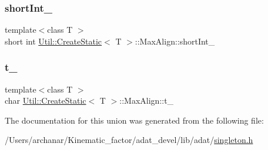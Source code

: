 \mbox{\label{unionUtil_1_1CreateStatic_1_1MaxAlign_a334412ad4ce26924cece7d29af8e8631}} 
\subsubsection{\texorpdfstring{shortInt\_}{shortInt\_}}
{\footnotesize\ttfamily template$<$class T $>$ \\
short int \mbox{\hyperlink{structUtil_1_1CreateStatic}{Util\+::\+Create\+Static}}$<$ T $>$\+::Max\+Align\+::short\+Int\+\_\+}

\mbox{\label{unionUtil_1_1CreateStatic_1_1MaxAlign_afd4240e90cbb2875a201cea03af46086}} 
\subsubsection{\texorpdfstring{t\_}{t\_}}
{\footnotesize\ttfamily template$<$class T $>$ \\
char \mbox{\hyperlink{structUtil_1_1CreateStatic}{Util\+::\+Create\+Static}}$<$ T $>$\+::Max\+Align\+::t\+\_\+}



The documentation for this union was generated from the following file\+:\begin{DoxyCompactItemize}
\item 
/\+Users/archanar/\+Kinematic\+\_\+factor/adat\+\_\+devel/lib/adat/\mbox{\hyperlink{lib_2adat_2singleton_8h}{singleton.\+h}}\end{DoxyCompactItemize}
